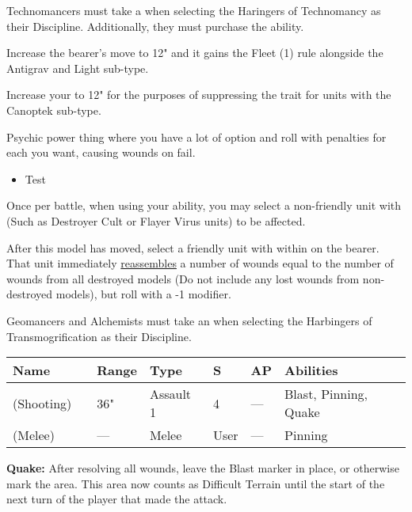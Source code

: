 
Technomancers must take a  when selecting the Haringers of Technomancy as their Discipline. Additionally, they must purchase the  ability.


Increase the bearer's move to 12" and it gains the Fleet (1) rule alongside the Antigrav and Light sub-type.


Increase your  to 12" for the purposes of suppressing the  trait for units with the Canoptek sub-type.


Psychic power thing where you have a lot of option and roll with penalties for each you want, causing wounds on fail.

\begin{itemize}
	\item Test
\end{itemize}


Once per battle, when using your  ability, you may select a non-friendly unit with  (Such as Destroyer Cult or Flayer Virus units) to be affected.

 \label{Rites of Reanimation}

After this model has moved, select a friendly unit with  within  on the bearer. That unit immediately \textcolor{violet}{\hyperref[Reanimation Protocols]{reassembles}} a number of wounds equal to the number of wounds from all destroyed models (Do not include any lost wounds from non-destroyed models), but roll with a -1 modifier.




Geomancers and Alchemists must take an  when selecting the Harbingers of Transmogrification as their Discipline.

\label{Tremorstave}
\noindent
\begin{tabular}{||m{130pt} m{10pt} m{31pt} m{55pt} m{12pt} m{12pt} m{210pt}||}
	\hline
	Name & & Range & Type & S & AP & Abilities \\
	\hline
	\quickref{Tremorstave} (Shooting) & & 36" & Assault 1 & 4 & — & Blast, Pinning, Quake \\
	\quickref{Tremorstave} (Melee) & & — & Melee & User & — & Pinning \\
	\hline
\end{tabular}
\textbf{Quake:} After resolving all wounds, leave the Blast marker in place, or otherwise mark the area. This area now counts as Difficult Terrain until the start of the next turn of the player that made the attack.

